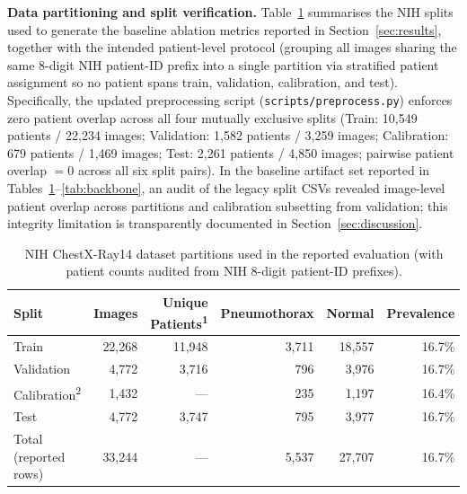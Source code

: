 \documentclass[diagnostics,article,submit,moreauthors]{Definitions/mdpi}
\newcommand{\rev}[1]{#1}
\begin{document}
\textbf{Data partitioning and split verification.} Table~\ref{tab:dataset} summarises the NIH splits used to generate the baseline ablation metrics reported in Section~\ref{sec:results}, together with the intended patient-level protocol (grouping all images sharing the same 8-digit NIH patient-ID prefix into a single partition via stratified patient assignment so no patient spans train, validation, calibration, and test). \rev{Specifically, the updated preprocessing script (\texttt{scripts/preprocess.py}) enforces zero patient overlap across all four mutually exclusive splits (Train: 10,549 patients / 22,234 images; Validation: 1,582 patients / 3,259 images; Calibration: 679 patients / 1,469 images; Test: 2,261 patients / 4,850 images; pairwise patient overlap $= 0$ across all six split pairs). In the baseline artifact set reported in Tables~\ref{tab:dataset}--\ref{tab:backbone}, an audit of the legacy split CSVs revealed image-level patient overlap across partitions and calibration subsetting from validation; this integrity limitation is transparently documented in Section~\ref{sec:discussion}.}

\begin{table}[H]
\caption{\rev{NIH ChestX-Ray14 dataset partitions used in the reported evaluation (with patient counts audited from NIH 8-digit patient-ID prefixes).}}\label{tab:dataset}
\begin{tabular}{@{}lrrrrr@{}}
\toprule
Split & Images & \rev{Unique Patients\textsuperscript{1}} & Pneumothorax & Normal & Prevalence\\
\midrule
Train & 22,268 & \rev{11,948} & 3,711 & 18,557 & 16.7\%\\
Validation & 4,772 & \rev{3,716} & 796 & 3,976 & 16.7\%\\
Calibration\textsuperscript{2} & 1,432 & \rev{---} & 235 & 1,197 & 16.4\%\\
Test & 4,772 & \rev{3,747} & 795 & 3,977 & 16.7\%\\
\midrule
Total (reported rows) & 33,244 & \rev{---} & 5,537 & 27,707 & 16.7\%\\
\bottomrule
\end{tabular}
\end{table}
\end{document}
